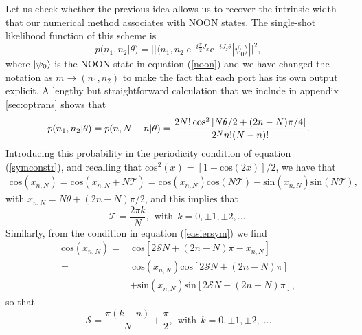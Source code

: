 Let us check whether the previous idea allows us to recover the intrinsic width that our numerical method associates with NOON states. The single-shot likelihood function of this scheme is
\begin{equation}
p(n_1, n_2 | \theta) = || \langle n_1, n_2 | \mathrm{e}^{-i\frac{\pi}{2}J_x} \mathrm{e}^{-i J_z \theta}| \psi_0 \rangle ||^2,
\end{equation}
where $\ket{\psi_0}$ is the NOON state in equation (\ref{noon}) and we have changed the notation as $m \rightarrow (n_1,n_2)$ to make the fact that each port has its own output explicit. A lengthy but straightforward calculation that we include in appendix \ref{sec:optrans} shows that
\begin{equation}
p(n_1, n_2 | \theta) = p(n,N-n|\theta) = \frac{2 N! \hspace{0.2em} \mathrm{cos}^2\left[N\theta/2 + (2n-N)\pi/4\right]}{2^N n! (N-n)!}.
\end{equation}
Introducing this probability in the periodicity condition of equation (\ref{symconstr}), and recalling that $\mathrm{cos}^2(x)=[1+\mathrm{cos}(2x)]/2$, we have that 
\begin{eqnarray}
\mathrm{cos}\left(x_{n,N}\right) = \mathrm{cos}\left(x_{n,N} + N\mathcal{T}\right) = \mathrm{cos}\left(x_{n,N}\right)\mathrm{cos}\left(N \mathcal{T} \right)  - \mathrm{sin}\left(x_{n,N}\right)\mathrm{sin}\left(N \mathcal{T} \right),
\end{eqnarray}
with $x_{n,N} = N\theta + (2n-N)\pi/2$, and this implies that
\begin{equation}
\mathcal{T} = \frac{2\pi k}{N}, ~~ \text{with}~~k=0, \pm 1, \pm 2, \dots.
\label{periodicity}
\end{equation}
Similarly, from the condition in equation (\ref{easiersym}) we find
\begin{align}
\mathrm{cos}\left(x_{n,N}\right) = &~\mathrm{cos}\left[2\mathcal{S}N + \left(2n - N\right)\pi - x_{n, N}\right]
\nonumber \\
= &~\mathrm{cos}\left(x_{n,N}\right)\mathrm{cos}\left[2\mathcal{S}N + \left(2n - N\right)\pi \right]  
\nonumber \\
& + \mathrm{sin}\left(x_{n,N}\right)\mathrm{sin}\left[2\mathcal{S}N + \left(2n - N\right)\pi \right],
\end{align}
so that
\begin{equation}
\mathcal{S} = \frac{\pi\left(k-n\right)}{N} + \frac{\pi}{2},  ~~ \text{with}~~k=0, \pm 1, \pm 2, \dots.
\label{mirrorsymmetry}
\end{equation}

